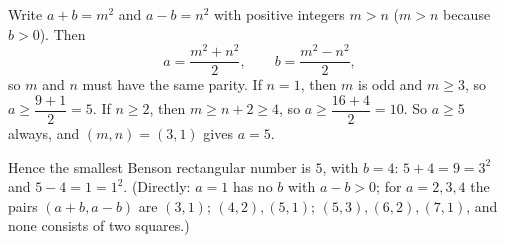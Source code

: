 Write $a+b=m^2$ and $a-b=n^2$ with positive integers $m>n$ ($m>n$ because $b>0$). Then
\[
a=\dfrac{m^2+n^2}{2},\qquad b=\dfrac{m^2-n^2}{2},
\]
so $m$ and $n$ must have the same parity. If $n=1$, then $m$ is odd and $m\ge3$, so $a\ge\dfrac{9+1}{2}=5$. If $n\ge2$, then $m\ge n+2\ge4$, so $a\ge\dfrac{16+4}{2}=10$. So $a\ge5$ always, and $(m,n)=(3,1)$ gives $a=5$.

Hence the smallest Benson rectangular number is $\boxed{5}$, with $b=4$: $5+4=9=3^2$ and $5-4=1=1^2$. (Directly: $a=1$ has no $b$ with $a-b>0$; for $a=2,3,4$ the pairs $(a+b,a-b)$ are $(3,1)$; $(4,2),(5,1)$; $(5,3),(6,2),(7,1)$, and none consists of two squares.)
